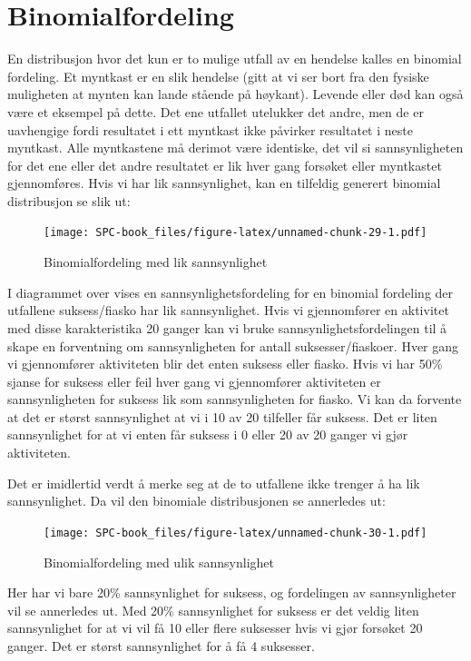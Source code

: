 \documentclass[
]{book}
\begin{document}
\hypertarget{binomialfordeling}{%
\section{Binomialfordeling}\label{binomialfordeling}}

En distribusjon hvor det kun er to mulige utfall av en hendelse kalles en binomial fordeling. Et myntkast er en slik hendelse (gitt at vi ser bort fra den fysiske muligheten at mynten kan lande stående på høykant). Levende eller død kan også være et eksempel på dette. Det ene utfallet utelukker det andre, men de er uavhengige fordi resultatet i ett myntkast ikke påvirker resultatet i neste myntkast. Alle myntkastene må derimot være identiske, det vil si sannsynligheten for det ene eller det andre resultatet er lik hver gang forsøket eller myntkastet gjennomføres. Hvis vi har lik sannsynlighet, kan en tilfeldig generert binomial distribusjon se slik ut:

\begin{figure}
\centering
\texttt{[image: SPC-book\_files/figure-latex/unnamed-chunk-29-1.pdf]}
\caption{\label{fig:unnamed-chunk-29}Binomialfordeling med lik sannsynlighet}
\end{figure}

I diagrammet over vises en sannsynlighetsfordeling for en binomial fordeling der utfallene suksess/fiasko har lik sannsynlighet. Hvis vi gjennomfører en aktivitet med disse karakteristika 20 ganger kan vi bruke sannsynlighetsfordelingen til å skape en forventning om sannsynligheten for antall suksesser/fiaskoer. Hver gang vi gjennomfører aktiviteten blir det enten suksess eller fiasko. Hvis vi har 50\% sjanse for suksess eller feil hver gang vi gjennomfører aktiviteten er sannsynligheten for suksess lik som sannsynligheten for fiasko. Vi kan da forvente at det er størst sannsynlighet at vi i 10 av 20 tilfeller får suksess. Det er liten sannsynlighet for at vi enten får suksess i 0 eller 20 av 20 ganger vi gjør aktiviteten.

Det er imidlertid verdt å merke seg at de to utfallene ikke trenger å ha lik sannsynlighet. Da vil den binomiale distribusjonen se annerledes ut:

\begin{figure}
\centering
\texttt{[image: SPC-book\_files/figure-latex/unnamed-chunk-30-1.pdf]}
\caption{\label{fig:unnamed-chunk-30}Binomialfordeling med ulik sannsynlighet}
\end{figure}

Her har vi bare 20\% sannsynlighet for suksess, og fordelingen av sannsynligheter vil se annerledes ut. Med 20\% sannsynlighet for suksess er det veldig liten sannsynlighet for at vi vil få 10 eller flere suksesser hvis vi gjør forsøket 20 ganger. Det er størst sannsynlighet for å få 4 suksesser.
\end{document}
